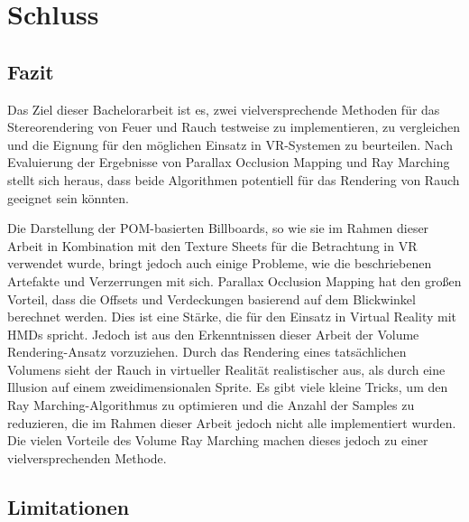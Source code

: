 \section{Schluss}
\label{sec:6}

\subsection{Fazit}
\label{sec:6.1}
Das Ziel dieser Bachelorarbeit ist es, zwei vielversprechende Methoden für das Stereorendering von Feuer und Rauch testweise zu implementieren, 
zu vergleichen und die Eignung für den möglichen Einsatz in VR-Systemen zu beurteilen. 
Nach Evaluierung der Ergebnisse von Parallax Occlusion Mapping und Ray Marching stellt sich heraus, dass beide Algorithmen potentiell für das Rendering 
von Rauch geeignet sein könnten.

Die Darstellung der POM-basierten Billboards, so wie sie im Rahmen dieser Arbeit in Kombination mit den Texture Sheets für die Betrachtung in VR 
verwendet wurde, bringt jedoch auch einige Probleme, wie die beschriebenen Artefakte und Verzerrungen mit sich. 
Parallax Occlusion Mapping hat den großen Vorteil, dass die Offsets und Verdeckungen basierend auf dem Blickwinkel berechnet werden. 
Dies ist eine Stärke, die für den Einsatz in Virtual Reality mit HMDs spricht. Jedoch ist aus den Erkenntnissen dieser Arbeit der Volume 
Rendering-Ansatz vorzuziehen. Durch das Rendering eines tatsächlichen Volumens sieht der Rauch in virtueller Realität realistischer aus, 
als durch eine Illusion auf einem zweidimensionalen Sprite. Es gibt viele kleine Tricks, um den Ray Marching-Algorithmus zu optimieren und die Anzahl der 
Samples zu reduzieren, die im Rahmen dieser Arbeit jedoch nicht alle implementiert wurden. 
Die vielen Vorteile des Volume Ray Marching machen dieses jedoch zu einer vielversprechenden Methode.

\subsection{Limitationen}
\label{sec:6.2}

